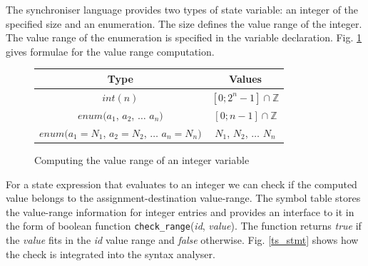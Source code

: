 


The synchroniser language provides two types of state variable: an integer of the specified size and an enumeration. The size defines the value range of the integer. The value range of the enumeration is specified in the variable declaration. Fig. \ref{int_range} gives formulae for the value range computation.


\begin{figure}%
\centering
\begin{tabular}{|c|c|}
\hline
Type & Values\\
\hline
$int(n)$ & $[0; 2^{n}-1] \cap \mathbb{Z}$\\
\hline
$enum(a_1$, $a_2$, $\dots$ $a_n)$ & $[0; n-1] \cap \mathbb{Z}$\\
\hline
$enum(a_1=N_1$, $a_2=N_2$, $\dots$ $a_n=N_n)$ & $N_1$, $N_2$, $\dots$ $N_n$\\
\hline
\end{tabular}
\caption{Computing the value range of an integer variable\label{int_range}}
\end{figure}

For a state expression that evaluates to an integer we can check if the computed value belongs to the assignment-destination value-range. The symbol table stores the value-range information for integer entries and provides an interface to it in the form of boolean function \texttt{check\_range}(\emph{id}, \emph{value}). The function returns \emph{true} if the \emph{value} fits in the \emph{id} value range and \emph{false} otherwise. Fig. \ref{ts_stmt} shows how the check is integrated into the syntax analyser.

